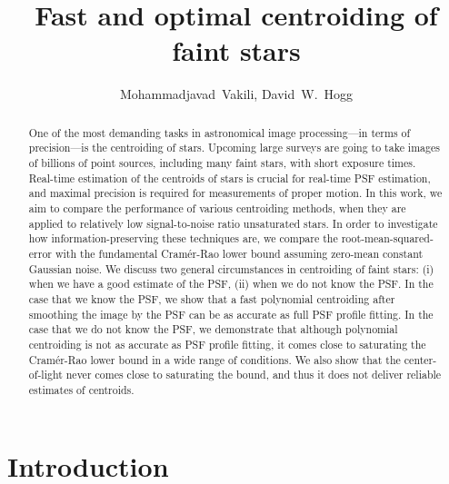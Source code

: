 \documentclass[12pt, preprint]{aastex}
\begin{document}
\author{
  Mohammadjavad~Vakili,
  David~W.~Hogg}

\title{Fast and optimal centroiding of faint stars}

\begin{abstract}
One of the most demanding tasks in astronomical image processing---in terms of precision---is the centroiding of stars. 
Upcoming large surveys are going to take images of billions of point sources, 
including many faint stars, with short exposure times. Real-time estimation of the
centroids of stars is crucial for real-time PSF estimation, and maximal precision is required
for measurements of proper motion. In this work, we aim to compare the performance of
various centroiding methods, when they are applied
to relatively low signal-to-noise ratio unsaturated stars.
In order to investigate how information-preserving these techniques are, we compare
the root-mean-squared-error with the fundamental Cram\'{e}r-Rao
lower bound assuming zero-mean constant Gaussian noise. We discuss two general circumstances in centroiding of faint stars: (i) when we have a good estimate
of the PSF, (ii) when we do not know the PSF. In the case that we know the PSF, 
we show that a fast polynomial centroiding after smoothing the image by the PSF can be 
as accurate as full PSF profile fitting. In the case that we do not
know the PSF, we demonstrate that although polynomial centroiding is not as
accurate as PSF profile fitting, it comes close to saturating the Cram\'{e}r-Rao lower bound
in a wide range of conditions. We also show that the center-of-light never comes close to 
saturating the bound, and thus it does not deliver reliable estimates of centroids.    

\end{abstract}

\section{Introduction}
\end{document}
